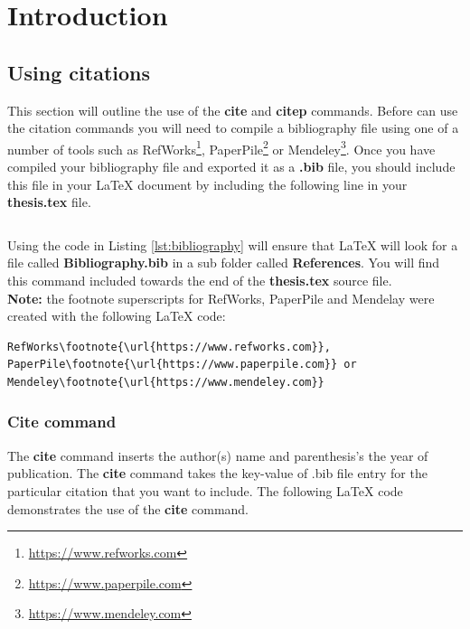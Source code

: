 \chapter{Introduction}\label{chapter:introduction}

\section{Using citations}\label{sec:citations}
This section will outline the use of the \textbf{cite} and \textbf{citep} commands. Before can use the citation commands you will need to compile a bibliography file using one of a number of tools such as RefWorks\footnote{\url{https://www.refworks.com}}, PaperPile\footnote{\url{https://www.paperpile.com}} or Mendeley\footnote{\url{https://www.mendeley.com}}. Once you have compiled your bibliography file and exported it as a \textbf{.bib} file, you should include this file in your \LaTeX{} document by including the following line in your \textbf{thesis.tex} file. \\

\begin{lstlisting}[caption={Including your bibliography file}, numbers=none, label={lst:bibliography}]

\end{lstlisting}

Using the code in Listing \ref{lst:bibliography} will ensure that \LaTeX{} will look for a file called \textbf{Bibliography.bib} in a sub folder called \textbf{References}. You will find this command included towards the end of the \textbf{thesis.tex} source file. \\

\textbf{Note:} the footnote superscripts for RefWorks, PaperPile and Mendelay were created with the following \LaTeX{} code:

\begin{lstlisting}[caption={Using the \textbf{footnote} command}, numbers=none, label={lst:footnote}]
RefWorks\footnote{\url{https://www.refworks.com}},
PaperPile\footnote{\url{https://www.paperpile.com}} or
Mendeley\footnote{\url{https://www.mendeley.com}}
\end{lstlisting}

\subsection{Cite command}\label{sec:cite-command}
The \textbf{cite} command inserts the author(s) name and parenthesis's the year of publication. The \textbf{cite} command takes the key-value of .bib file entry for the particular citation that you want to include. The following \LaTeX{} code demonstrates the use of the \textbf{cite} command. \\

